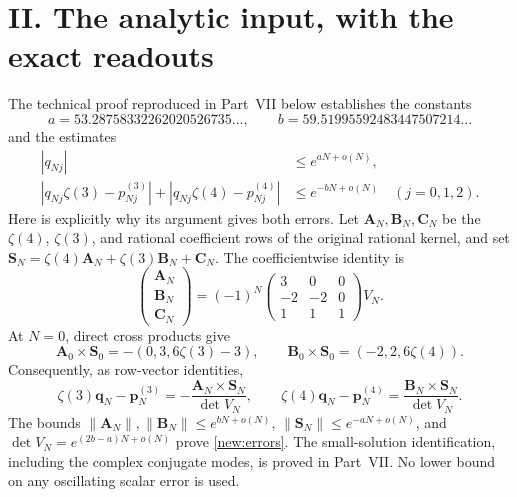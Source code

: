 \documentclass[11pt]{article}
\begin{document}
\section*{II. The analytic input, with the exact readouts}
The technical proof reproduced in Part~VII below establishes the constants
\[
 a=53.28758332262020526735\ldots,\qquad
 b=59.51995592483447507214\ldots
\]
and the estimates
\begin{align}
 |q_{Nj}|&\le e^{aN+o(N)},\label{new:growth}\\
 |q_{Nj}\zeta(3)-p^{(3)}_{Nj}|+
 |q_{Nj}\zeta(4)-p^{(4)}_{Nj}|&\le e^{-bN+o(N)}\quad(j=0,1,2).
 \label{new:errors}
\end{align}
Here is explicitly why its argument gives both errors. Let
$\mathbf A_N,\mathbf B_N,\mathbf C_N$ be the $\zeta(4)$, $\zeta(3)$, and
rational coefficient rows of the original rational kernel, and set
$\mathbf S_N=\zeta(4)\mathbf A_N+\zeta(3)\mathbf B_N+\mathbf C_N$.
The coefficientwise identity is
\[
 \begin{pmatrix}\mathbf A_N\\\mathbf B_N\\\mathbf C_N\end{pmatrix}
 =(-1)^N\begin{pmatrix}3&0&0\\-2&-2&0\\1&1&1\end{pmatrix}V_N.
\]
At $N=0$, direct cross products give
\[
 \mathbf A_0\times\mathbf S_0
   =-(0,3,6\zeta(3)-3),\qquad
 \mathbf B_0\times\mathbf S_0=(-2,2,6\zeta(4)).
\]
Consequently, as row-vector identities,
\[
 \zeta(3)\mathbf q_N-\mathbf p^{(3)}_N
  =-\frac{\mathbf A_N\times\mathbf S_N}{\det V_N},\qquad
 \zeta(4)\mathbf q_N-\mathbf p^{(4)}_N
  =\frac{\mathbf B_N\times\mathbf S_N}{\det V_N}.
\]
The bounds $\|\mathbf A_N\|,\|\mathbf B_N\|\le e^{bN+o(N)}$,
$\|\mathbf S_N\|\le e^{-aN+o(N)}$, and
$\det V_N=e^{(2b-a)N+o(N)}$ prove \eqref{new:errors}.
The small-solution identification, including the complex conjugate modes,
is proved in Part~VII. No lower bound on any oscillating scalar error is used.
\end{document}
